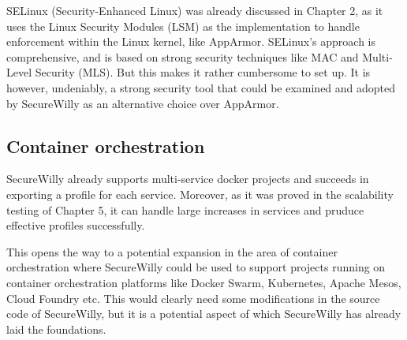 SELinux (Security-Enhanced Linux) was already discussed in Chapter 2, as it uses the Linux Security Modules (LSM) as the implementation to handle enforcement within the Linux kernel, like AppArmor. SELinux's approach is comprehensive, and is based on strong security techniques like MAC and Multi-Level Security (MLS). But this makes it rather cumbersome to set up. \cite{appsel} It is however, undeniably, a strong security tool that could be examined and adopted by SecureWilly as an alternative choice over AppArmor.

\subsection{Container orchestration}
SecureWilly already supports multi-service docker projects and succeeds in exporting a profile for each service. Moreover, as it was proved in the scalability testing of Chapter 5, it can handle large increases in services and pruduce effective profiles successfully.

This opens the way to a potential expansion in the area of container orchestration where SecureWilly could be used to support projects running on container orchestration platforms like Docker Swarm, Kubernetes, Apache Mesos, Cloud Foundry etc. This would clearly need some modifications in the source code of SecureWilly, but it is a potential aspect of which SecureWilly has already laid the foundations.
